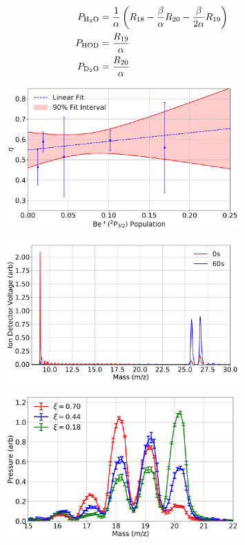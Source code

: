 \begin{align}
	P_{\ce{H2O}} & = \frac{1}{\alpha}\left(R_{18} - \frac{\beta}{\alpha}R_{20} - \frac{\beta}{2\alpha} R_{19}\right) \\
	P_{\ce{HOD}} & = \frac{R_{19}}{\alpha} \\
	P_{\ce{D2O}} & = \frac{R_{20}}{\alpha}
\end{align}

\begin{figure}[H]
	\centering
	\includegraphics[width=0.8\textwidth]{images/Be_HOD_p_state.png}
	\caption{}
	\label{}
\end{figure}

\begin{figure}[H]
	\centering
	\includegraphics[width=0.8\textwidth]{images/Be_HOD_TOF.png}
	\caption{}
	\label{}
\end{figure}

\begin{figure}[H]
	\centering
	\includegraphics[width=0.8\textwidth]{images/Be_HOD_RGA.png}
	\caption{}
	\label{}
\end{figure}

